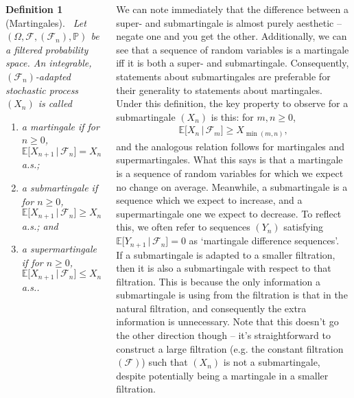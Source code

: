 \documentclass{tikzposter} %
\newtheorem{definition}{Definition}
\begin{document}
\begin{columns}
{    \begin{definition}[Martingales]
      \ Let $(\Omega, \mathcal{F}, (\mathcal{F}_{n}), \mathbb{P})$ be a filtered probability space. An integrable, $(\mathcal{F}_{n})$-adapted stochastic process $(X_{n})$ is called
      \begin{enumerate}[label=\roman*.]
      \item a martingale if for $n \ge 0$, $\mathbb{E}\big[X_{n+1} \,|\, \mathcal{F}_{n}\big] = X_{n}$ a.s.;
      \item a submartingale if for $n \ge 0$, $\mathbb{E}\big[X_{n+1} \,|\, \mathcal{F}_{n}\big] \ge X_{n}$ a.s.; and
      \item a supermartingale if for $n \ge 0$, $\mathbb{E}\big[X_{n+1} \,|\, \mathcal{F}_{n}\big] \le X_{n}$ a.s..
      \end{enumerate}
    \end{definition}
    \hphantom{}

    We can note immediately that the difference between a super- and submartingale is almost purely aesthetic -- negate one and you get the other. Additionally, we can see that a sequence of random variables is a martingale iff it is both a super- and submartingale. Consequently, statements about submartingales are preferable for their generality to statements about martingales. \\

    Under this definition, the key property to observe for a submartingale $(X_{n})$ is this: for $m,n \ge 0$,
    \begin{align*}
      \mathbb{E}\big[X_{n} \,|\, \mathcal{F}_{m}\big] \ge X_{\min(m,n)},
    \end{align*}
    and the analogous relation follows for martingales and supermartingales. What this says is that a martingale is a sequence of random variables for which we expect no change on average. Meanwhile, a submartingale is a sequence which we expect to increase, and a supermartingale one we expect to decrease. To reflect this, we often refer to sequences $(Y_{n})$ satisfying $\mathbb{E}\big[Y_{n+1} \,|\, \mathcal{F}_{n}\big] = 0$ as `martingale difference sequences'. \\

    If a submartingale is adapted to a smaller filtration, then it is also a submartingale with respect to that filtration. This is because the only information a submartingale is using from the filtration is that in the natural filtration, and consequently the extra information is unnecessary. Note that this doesn't go the other direction though -- it's straightforward to construct a large filtration (e.g. the constant filtration $(\mathcal{F})$) such that $(X_{n})$ is not a submartingale, despite potentially being a martingale in a smaller filtration. \\

}
\end{columns}
\end{document}
